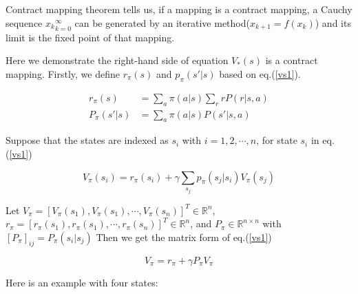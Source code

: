 Contract mapping theorem tells us, if a mapping is a contract mapping, a Cauchy sequence ${x_k}_{k=0}^{\infty}$ can be generated by an iterative method($x_{k+1}=f(x_k)$) and its limit is the fixed point of that mapping. \par

Here we demonstrate the right-hand side of equation $V_{*}^{}(s)$ is a contract mapping. Firstly, we define $r_{\pi}(s)$ and $p_{\pi}(s'|s)$ based on eq.(\ref{vs1}). 

\begin{align*}
  r_{\pi}(s) &= \sum_{a}\pi(a|s)\sum_{r}rP(r|s,a) \\
  P_{\pi}(s'|s) &= \sum_{a}\pi(a|s)P(s'|s,a)
\end{align*}

Suppose that the states are indexed as $s_{i}$ with $i=1,2,\cdots,n$, for state $s_{i}$ in eq.(\ref{vs1})

\begin{equation*}
V_{\pi}(s_i)=r_{\pi}(s_i)+\gamma \sum_{s_j}p_{\pi}(s_j|s_i)V_{\pi}(s_j)
\end{equation*}

{\linespread{1.13}\selectfont
Let $V_{\pi}=[V_{\pi}(s_1),V_{\pi}(s_1),\cdots,V_{\pi}(s_n)]^T \in \mathbb{R}^n$,  $r_{\pi}=[r_{\pi}(s_1),r_{\pi}(s_1),\cdots,r_{\pi}(s_n)]^T \in \mathbb{R}^n$, and $P_{\pi} \in \mathbb{R}^{n \times n}$ with $[P_{\pi}]_{ij}=P_{\pi}(s_i|s_j)$ Then we get the matrix form of eq.(\ref{vs1}) \par}

\begin{equation*} 
    V_{\pi}=r_{\pi}+\gamma P_{\pi}V_{\pi}
\end{equation*} 

Here is an example with four states:

